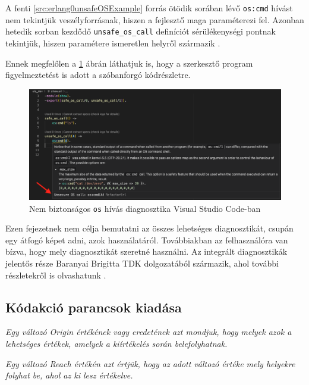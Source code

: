 A fenti \ref{src:erlang0unsafeOSExample} forrás ötödik sorában lévő \lstinline{os:cmd} hívást nem tekintjük veszélyforrásnak, hiszen a fejlesztő maga paraméterezi fel. Azonban hetedik sorban kezdődő \lstinline{unsafe_os_call} definíciót sérülékenységi pontnak tekintjük, hiszen paramétere ismeretlen helyről származik \cite{refactorerlSecurity}.

Ennek megfelőlen a \ref{fig:unsafe_os_call_vscode} ábrán láthatjuk is, hogy a szerkesztő program figyelmeztetést is adott a szóbanforgó kódrészletre. 

\begin{figure}[H]
  \centering
  \includegraphics[width=\linewidth]{images/unsafe_os_with_safe_os.png}
  \caption{Nem biztonságos \lstinline{os} hívás diagnosztika Visual Studio Code-ban}
  \label{fig:unsafe_os_call_vscode}
\end{figure}

Ezen fejezetnek nem célja bemutatni az összes lehetséges diagnosztikát, csupán egy átfogó képet adni, azok használatáról. Továbbiakban az felhasználóra van bízva, hogy mely diagnosztikát szeretné használni. Az integrált diagnosztikák jelentős része Baranyai Brigitta TDK dolgozatából származik, ahol további részletekről is olvashatunk \cite{refactorerlSecurity}.


\subsection{Kódakció parancsok kiadása}

\textit{Egy változó Origin értékének vagy eredetének azt mondjuk, hogy melyek azok a lehetséges értékek, amelyek a kiírtékelés során belefolyhatnak.} \cite{macs10paper} \cite{cefp11paper} 

\textit{Egy változó Reach értékén azt értjük, hogy az adott változó értéke mely helyekre folyhat be, ahol az ki lesz értékelve.} \cite{macs10paper} \cite{cefp11paper} 

